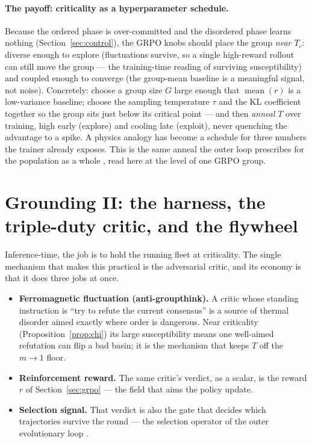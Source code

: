 \documentclass[11pt]{article}
\begin{document}
\paragraph{The payoff: criticality as a hyperparameter schedule.} Because the ordered phase is over-committed
and the disordered phase learns nothing (Section~\ref{sec:control}), the GRPO knobs should place the group
\emph{near $T_c$}: diverse enough to explore (fluctuations survive, so a single high-reward rollout can still
move the group --- the training-time reading of surviving susceptibility) and coupled enough to converge (the
group-mean baseline is a meaningful signal, not noise). Concretely: choose a group size $G$ large enough that
$\operatorname{mean}(r)$ is a low-variance baseline; choose the sampling temperature $\tau$ and the KL
coefficient together so the group sits just below its critical point --- and then \emph{anneal} $T$ over
training, high early (explore) and cooling late (exploit), never quenching the advantage to a spike. A physics
analogy has become a schedule for three numbers the trainer already exposes. This is the same anneal the outer
loop prescribes for the population as a whole \cite{hanzo-evolutionary-orchestration}, read here at the level of
one GRPO group.

\section{Grounding II: the harness, the triple-duty critic, and the flywheel}
\label{sec:harness}

Inference-time, the job is to hold the running fleet at criticality. The single mechanism that makes this
practical is the adversarial critic, and its economy is that it does three jobs at once.

\begin{itemize}[leftmargin=1.4em,itemsep=2pt]
\item \textbf{Ferromagnetic fluctuation (anti-groupthink).} A critic whose standing instruction is ``try to
refute the current consensus'' is a source of thermal disorder aimed exactly where order is dangerous. Near
criticality (Proposition~\ref{prop:chi}) its large susceptibility means one well-aimed refutation can flip a bad
basin; it is the mechanism that keeps $T$ off the $m\to1$ floor.
\item \textbf{Reinforcement reward.} The same critic's verdict, as a scalar, is the reward $r$ of
Section~\ref{sec:grpo} --- the field that aims the policy update.
\item \textbf{Selection signal.} That verdict is also the gate that decides which trajectories survive the
round --- the selection operator of the outer evolutionary loop \cite{hanzo-evolutionary-orchestration}.
\end{itemize}
\end{document}
